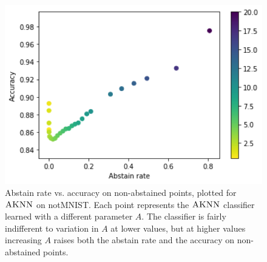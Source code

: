 \documentclass{article}
\newcommand{\algname}{\textsc{AKNN}}
\begin{document}
\begin{figure}
    \centering
    \includegraphics[width=0.8\linewidth]{figs/notMNIST/notMNIST_accvsabst.png}
  \caption{Abstain rate vs. accuracy on non-abstained points, plotted for $\algname$ on notMNIST. Each point represents the $\algname$ classifier learned with a different parameter $A$. The classifier is fairly indifferent to variation in $A$ at lower values, but at higher values increasing $A$ raises both the abstain rate and the accuracy on non-abstained points.}
  \label{fig:abst-vs-acc}
\end{figure}
\end{document}
